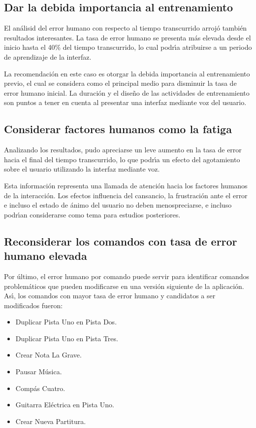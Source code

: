 \subsection{Dar la debida importancia al entrenamiento}
El an\'alisid del error humano con respecto al tiempo transcurrido arroj\'o tambi\'en
resultados interesantes. La tasa de error humano se presenta m\'as elevada desde el inicio hasta
el 40\% del tiempo transcurrido, lo cual podr{{\'\i}}a atribuirse a un periodo de aprendizaje
de la interfaz.

La recomendaci\'on en este caso es otorgar la debida importancia al entrenamiento previo,
el cual se considera como el principal medio para disminuir la tasa de error humano inicial.
La duraci\'on y el dise\~no de las actividades de entrenamiento son puntos a tener en cuenta
al presentar una interfaz mediante voz del usuario.

\subsection{Considerar factores humanos como la fatiga}
Analizando los resultados, pudo apreciarse un leve aumento en la tasa de error hacia el final del tiempo
transcurrido, lo que podr{{\'\i}}a un efecto del agotamiento sobre el usuario utilizando la
interfaz mediante voz.

Esta informaci\'on representa una llamada de atenci\'on hacia los factores humanos de la interacci\'on.
Los efectos influencia del cansancio, la frustraci\'on ante el error e incluso el estado de \'animo
del usuario no deben menospreciarse, e incluso podr{\'\i}an considerarse como tema para estudios
posteriores.

\subsection{Reconsiderar los comandos con tasa de error humano elevada}
Por \'ultimo, el error humano por comando puede servir para identificar comandos 
problem\'aticos que pueden modificarse en una versi\'on siguiente de la aplicaci\'on.
As{{\'\i}}, los comandos con mayor tasa de error humano y candidatos a ser modificados fueron:

\begin{itemize}
	\item Duplicar Pista Uno en Pista Dos.
	\item Duplicar Pista Uno en Pista Tres.
	\item Crear Nota La Grave.
	\item Pausar M\'usica.
	\item Comp\'as Cuatro.
	\item Guitarra El\'ectrica en Pista Uno.
	\item Crear Nueva Partitura.
\end{itemize}

